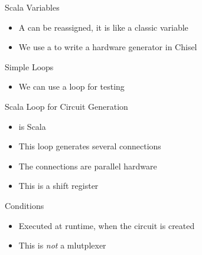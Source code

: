 \begin{frame}[fragile]{Scala Variables}
\begin{itemize}
\item A  can be reassigned, it is like a classic variable
\item We use a  to write a hardware generator in Chisel
\end{itemize}
\end{frame}

\begin{frame}[fragile]{Simple Loops}
\begin{itemize}
\item We can use a loop for testing
\end{itemize}
\end{frame}

\begin{frame}[fragile]{Scala  Loop for Circuit Generation}
\begin{itemize}
\item {} is Scala
\item This loop generates several connections
\item The connections are parallel hardware
\item This is a shift register
\end{itemize}
\end{frame}

\begin{frame}[fragile]{Conditions}
\begin{itemize}
\item Executed at runtime, when the circuit is created
\item This is \emph{not} a mlutplexer
\end{itemize}
\end{frame}


